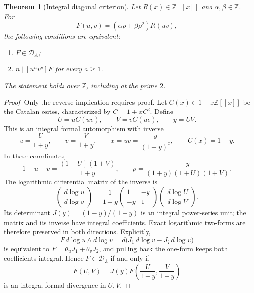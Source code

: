 \documentclass[11pt,a4paper]{article}
\newtheorem{theorem}{Theorem}[section]
\theoremstyle{remark}\newtheorem{remark}[theorem]{Remark}
\newcommand{\Z}{\mathbb Z}
\begin{document}
\begin{theorem}[Integral diagonal criterion]\label{cat:criterion}
Let \(R(x)\in\Z[[x]]\) and \(\alpha,\beta\in\Z\). For
\[
 F(u,v)=(\alpha\rho+\beta\rho^2)R(uv),
\]
the following conditions are equivalent:
\begin{enumerate}
 \item \(F\in\mathcal D_A\);
 \item \(n\mid[u^nv^n]F\) for every \(n\ge1\).
\end{enumerate}
The statement holds over \(\Z\), including at the prime \(2\).
\end{theorem}
\begin{proof}
Only the reverse implication requires proof. Let \(C(x)\in1+x\Z[[x]]\)
be the Catalan series, characterized by \(C=1+xC^2\). Define
\[
 U=uC(uv),\qquad V=vC(uv),\qquad y=UV.
\]
This is an integral formal automorphism with inverse
\begin{equation}\label{cat:inverse}
 u=\frac{U}{1+y},\qquad v=\frac{V}{1+y},\qquad
 x=uv=\frac{y}{(1+y)^2},\qquad C(x)=1+y.
\end{equation}
In these coordinates,
\[
 1+u+v=\frac{(1+U)(1+V)}{1+y},\qquad
 \rho=\frac{y}{(1+y)(1+U)(1+V)}.
\]
The logarithmic differential matrix of the inverse is
\[
 \begin{pmatrix}d\log u\\d\log v\end{pmatrix}
 =\frac1{1+y}
 \begin{pmatrix}1&-y\\-y&1\end{pmatrix}
 \begin{pmatrix}d\log U\\d\log V\end{pmatrix}.
\]
Its determinant \(J(y)=(1-y)/(1+y)\) is an integral power-series unit;
the matrix and its inverse have integral coefficients. Exact logarithmic
two-forms are therefore preserved in both directions. Explicitly,
\[
 F\,d\log u\wedge d\log v
 =d\bigl(J_1\,d\log v-J_2\,d\log u\bigr)
\]
is equivalent to \(F=\theta_uJ_1+\theta_vJ_2\), and pulling back the
one-form keeps both coefficients integral. Hence \(F\in\mathcal D_A\)
if and only if
\[
 \widetilde F(U,V)
 =J(y)F\left(\frac{U}{1+y},\frac{V}{1+y}\right)
\]
is an integral formal divergence in \(U,V\).


\end{proof}
\end{document}
